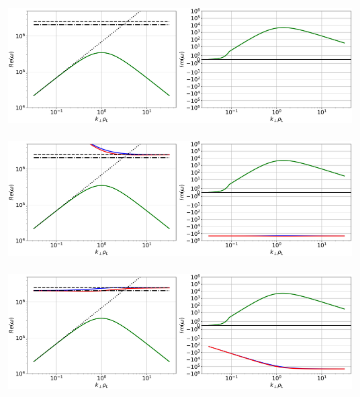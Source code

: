 \begin{figure}[H]
	\centering
	\begin{subfigure}[t]{0.85\textwidth}
		\centering
		\includegraphics[width=1\textwidth]{schemes/modes_ES.jpg}
		\label{fig:edge_modesES}
	\end{subfigure}
\end{figure}
\begin{figure}[H]
	\ContinuedFloat
	\centering
	\begin{subfigure}[t]{0.85\textwidth}
		\centering
		\includegraphics[width=1\textwidth]{schemes/modes_ES-inert.jpg}
		\label{fig:edge_modesEI}
	\end{subfigure}
\end{figure}
\begin{figure}[H]
	\ContinuedFloat
	\centering
	\begin{subfigure}[t]{0.85\textwidth}
		\centering
		\includegraphics[width=1\textwidth]{schemes/modes_EM.jpg}
		\label{fig:edge_modesEM}
	\end{subfigure}
\end{figure}
